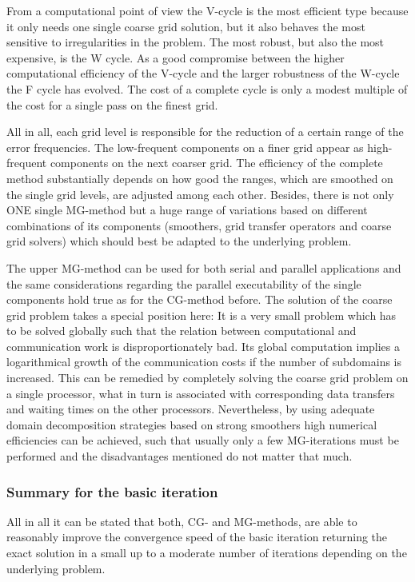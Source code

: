 From a computational point of view the V-cycle is the most efficient type because it only needs one single coarse grid solution, but it also behaves the most sensitive to irregularities in the problem.
The most robust, but also the most expensive, is the W cycle. As a good compromise between
the higher computational efficiency of the V-cycle and the larger 
robustness of the W-cycle the F cycle has evolved.
The cost of a complete cycle is only a modest multiple of the cost for a single pass on the finest grid.


All in all, each grid level is responsible for the reduction of a certain range of the error frequencies. The low-frequent components on a finer grid appear as high-frequent components on the next coarser grid. The efficiency of the complete method substantially depends on how good the ranges, which are smoothed on the single grid levels, are adjusted among each other.
%
Besides, there is not only ONE single MG-method but a huge range of variations based on different combinations of its components (smoothers, grid transfer operators and coarse grid solvers) which should best be adapted to the underlying problem.

The upper MG-method can be used for both serial and parallel applications and the same considerations regarding the parallel executability of the single components hold true as for the CG-method before.
%
The solution of the coarse grid problem takes a special position here: It is a very small problem which has to be solved globally such that the relation between computational and communication work is disproportionately bad.
Its global computation implies a logarithmical growth of the communication costs if the number of subdomains is increased. This can be remedied by completely solving the coarse grid problem on a single processor, what in turn is associated with corresponding data transfers and waiting times on the other processors. Nevertheless, by using adequate domain decomposition strategies based on strong smoothers high numerical efficiencies can be achieved, such that usually only a few MG-iterations must be performed and the disadvantages mentioned do not matter that much.


\subsubsection{Summary for the basic iteration} 
All in all it can be stated that both, CG- and MG-methods, are able to reasonably improve the convergence speed of the basic iteration returning the exact solution in a small up to a moderate number of iterations depending on the underlying problem. 

